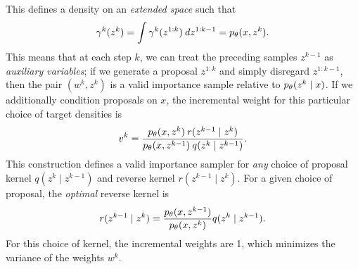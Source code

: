 \documentclass{article}
\theoremstyle{definition}
\begin{document}
This defines a density on an \emph{extended space} such that 
\begin{align*}
    \gamma^k(z^k) = \int \gamma^k(z^{1:k}) \: dz^{1:k-1} = p_\theta(x, z^k).
\end{align*}
This means that at each step $k$, we can treat the preceding samples $z^{k-1}$ as \emph{auxiliary variables}; if we generate a proposal $z^{1:k}$ and simply disregard $z^{1:k-1}$, then the pair $(w^k, z^k)$ is a valid importance sample relative to $p_\theta(z^k \mid x)$. If we additionally condition proposals on $x$, the incremental weight for this particular choice of target densities is
\begin{align}
    \label{eq:incremental-weight-forward-reverse}
    v^k 
    = 
    \frac{p_\theta(x,z^k) \: r(z^{k-1} \mid  z^k)}
         {p_\theta(x,z^{k-1}) \: q(z^{k} \mid  z^{k-1})}
    .
\end{align}
This construction defines a valid importance sampler for \emph{any} choice of proposal kernel $q(z^k \mid z^{k-1})$ and reverse kernel $r(z^{k-1} \mid z^{k})$. For a given choice of proposal, the \emph{optimal} reverse kernel is
\begin{align*}
    r(z^{k-1} \mid  z^k)
    =   
    \frac{p_\theta(x,z^{k-1})}
         {p_\theta(x,z^k)}
    q(z^{k} \mid  z^{k-1})
    .
\end{align*}
For this choice of kernel, the incremental weights are 1, which minimizes the variance of the weights $w^k$.
\end{document}

